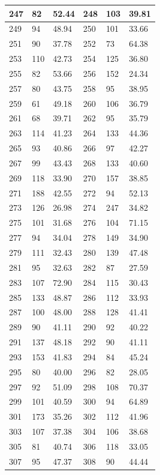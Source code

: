 \documentclass[10.9pt]{article} %
\begin{document}
{\begin{longtable}{|p{2cm}|p{2cm}|p{2cm}|p{2cm}|p{2cm}|p{2cm}|}
\hline
247 & 82& 52.44 & 248 & 103& 39.81\\
\hline
249 & 94& 48.94 & 250 & 101& 33.66\\
\hline
251 & 90& 37.78 & 252 & 73& 64.38\\
\hline
253 & 110& 42.73 & 254 & 125& 36.80\\
\hline
255 & 82& 53.66 & 256 & 152& 24.34\\
\hline
257 & 80& 43.75 & 258 & 95& 38.95\\
\hline
259 & 61& 49.18 & 260 & 106& 36.79\\
\hline
261 & 68& 39.71 & 262 & 95& 35.79\\
\hline
263 & 114& 41.23 & 264 & 133& 44.36\\
\hline
265 & 93& 40.86 & 266 & 97& 42.27\\
\hline
267 & 99& 43.43 & 268 & 133& 40.60\\
\hline
269 & 118& 33.90 & 270 & 157& 38.85\\
\hline
271 & 188& 42.55 & 272 & 94& 52.13\\
\hline
273 & 126& 26.98 & 274 & 247& 34.82\\
\hline
275 & 101& 31.68 & 276 & 104& 71.15\\
\hline
277 & 94& 34.04 & 278 & 149& 34.90\\
\hline
279 & 111& 32.43 & 280 & 139& 47.48\\
\hline
281 & 95& 32.63 & 282 & 87& 27.59\\
\hline
283 & 107& 72.90 & 284 & 115& 30.43\\
\hline
285 & 133& 48.87 & 286 & 112& 33.93\\
\hline
287 & 100& 48.00 & 288 & 128& 41.41\\
\hline
289 & 90& 41.11 & 290 & 92& 40.22\\
\hline
291 & 137& 48.18 & 292 & 90& 41.11\\
\hline
293 & 153& 41.83 & 294 & 84& 45.24\\
\hline
295 & 80& 40.00 & 296 & 82& 28.05\\
\hline
297 & 92& 51.09 & 298 & 108& 70.37\\
\hline
299 & 101& 40.59 & 300 & 94& 64.89\\
\hline
301 & 173& 35.26 & 302 & 112& 41.96\\
\hline
303 & 107& 37.38 & 304 & 106& 38.68\\
\hline
305 & 81& 40.74 & 306 & 118& 33.05\\
\hline
307 & 95& 47.37 & 308 & 90& 44.44\\

\end{longtable}}
\end{document}
